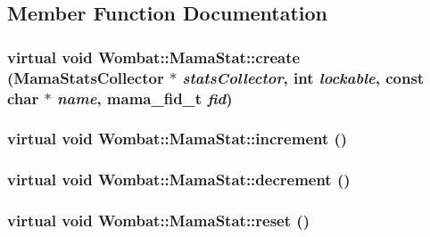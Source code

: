 \subsection{Member Function Documentation}
\hypertarget{classWombat_1_1MamaStat_a8a7883f682cebd4b9a23ee1a7723c4e0}{
\subsubsection[{create}]{\setlength{\rightskip}{0pt plus 5cm}virtual void Wombat::MamaStat::create ({\bf MamaStatsCollector} $\ast$ {\em statsCollector}, \/  int {\em lockable}, \/  const char $\ast$ {\em name}, \/  mama\_\-fid\_\-t {\em fid})}}
\label{classWombat_1_1MamaStat_a8a7883f682cebd4b9a23ee1a7723c4e0}
\hypertarget{classWombat_1_1MamaStat_abcac6508e2c63b05c75fce7b376f12a9}{
\subsubsection[{increment}]{\setlength{\rightskip}{0pt plus 5cm}virtual void Wombat::MamaStat::increment ()}}
\label{classWombat_1_1MamaStat_abcac6508e2c63b05c75fce7b376f12a9}
\hypertarget{classWombat_1_1MamaStat_a83e3448bb3580076b5957d18fc9743d1}{
\subsubsection[{decrement}]{\setlength{\rightskip}{0pt plus 5cm}virtual void Wombat::MamaStat::decrement ()}}
\label{classWombat_1_1MamaStat_a83e3448bb3580076b5957d18fc9743d1}
\hypertarget{classWombat_1_1MamaStat_a0ae9a2c4980dc05186e425e27b330fc5}{
\subsubsection[{reset}]{\setlength{\rightskip}{0pt plus 5cm}virtual void Wombat::MamaStat::reset ()}}
